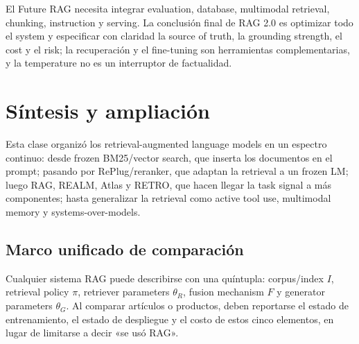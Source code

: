 \documentclass[a4paper]{article}
\begin{document}
El Future RAG necesita integrar evaluation, database, multimodal retrieval, chunking, instruction y serving. La conclusión final de RAG 2.0 es optimizar todo el system y especificar con claridad la source of truth, la grounding strength, el cost y el risk; la recuperación y el fine-tuning son herramientas complementarias, y la temperature no es un interruptor de factualidad.
\section{Síntesis y ampliación}

Esta clase organizó los retrieval-augmented language models en un espectro continuo: desde frozen BM25/vector search, que inserta los documentos en el prompt; pasando por RePlug/reranker, que adaptan la retrieval a un frozen LM; luego RAG, REALM, Atlas y RETRO, que hacen llegar la task signal a más componentes; hasta generalizar la retrieval como active tool use, multimodal memory y systems-over-models.

\subsection{Marco unificado de comparación}

Cualquier sistema RAG puede describirse con una quíntupla: corpus/index $I$, retrieval policy $\pi$, retriever parameters $\theta_R$, fusion mechanism $F$ y generator parameters $\theta_G$. Al comparar artículos o productos, deben reportarse el estado de entrenamiento, el estado de despliegue y el costo de estos cinco elementos, en lugar de limitarse a decir «se usó RAG».
\end{document}
